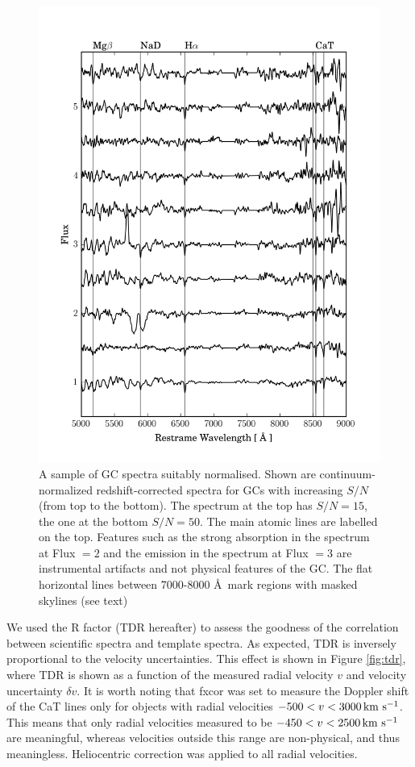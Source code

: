 \documentclass[useAMS,usenatbib]{mn2e}
\newcommand{\kms}{\mbox{\,km~s$^{-1}$}}
\begin{document}
\begin{figure}
\centering
\includegraphics[width=\columnwidth]{figures/vstack_spectra.png} 
\caption{A sample of GC spectra suitably normalised. Shown are continuum-normalized redshift-corrected spectra for GCs with increasing $S/N$ (from top to the bottom). The spectrum at the top has $S/N = 15$, the one at the bottom $S/N = 50$. The main atomic lines are labelled on the top. Features such as the strong absorption in the spectrum at Flux $= 2$ and the emission in the spectrum at Flux $=3$ are instrumental artifacts and not physical features of the GC. The flat horizontal lines between 7000-8000 \AA\ mark regions with masked skylines (see text)}
\label{fig:spectra}
\end{figure}

We used the \citet{Tonry79} R factor (TDR hereafter) to assess the goodness of the correlation between scientific spectra and template spectra. As expected, TDR is inversely proportional to the velocity uncertainties. This effect is shown in Figure \ref{fig:tdr}, where TDR is shown as a function of the measured radial velocity $v$ and velocity uncertainty $\delta v$. 
It is worth noting that fxcor was set to measure the Doppler shift of the CaT lines only for objects with radial velocities $-500 < v < 3000 \kms$. This means that only radial velocities measured to be $-450 < v < 2500 \kms$ are meaningful, whereas velocities outside this range are non-physical, and thus meaningless. Heliocentric correction was applied to all radial velocities. 
\end{document}
